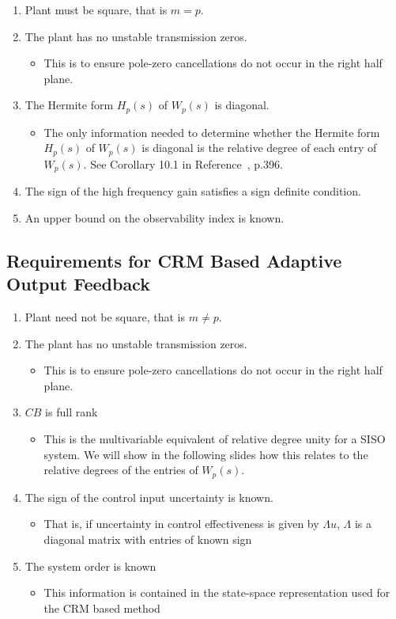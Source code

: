 \begin{enumerate}
  \item{Plant must be square, that is $m=p$.}
  \item{The plant has no unstable transmission zeros.}
  \begin{itemize}
    \item{This is to ensure pole-zero cancellations do not occur in the right half plane.}
  \end{itemize}
  \item{The Hermite form $H_{p}(s)$ of $W_{p}(s)$ is diagonal.}
  \begin{itemize}
    \item{%
      The only information needed to determine whether the Hermite form $H_{p}(s)$ of $W_{p}(s)$ is diagonal is the relative degree of each entry of $W_{p}(s)$.
      See Corollary 10.1 in Reference~\cite{narendra.stable.2005}, p.396.
    }
  \end{itemize}
  \item{The sign of the high frequency gain satisfies a sign definite condition.}
  \item{An upper bound on the observability index is known.}
\end{enumerate}

\subsection{Requirements for CRM Based Adaptive Output Feedback}

\begin{enumerate}
  \item{Plant need not be square, that is $m\neq p$.}
  \item{The plant has no unstable transmission zeros.}
  \begin{itemize}
    \item{This is to ensure pole-zero cancellations do not occur in the right half plane.}
  \end{itemize}
  \item{$CB$ is full rank}
  \begin{itemize}
    \item{%
      This is the multivariable equivalent of relative degree unity for a SISO system.
      We will show in the following slides how this relates to the relative degrees of the entries of $W_{p}(s)$.
    }
  \end{itemize}
  \item{The sign of the control input uncertainty is known.}
  \begin{itemize}
    \item{That is, if uncertainty in control effectiveness is given by $\Lambda u$, $\Lambda$ is a diagonal matrix with entries of known sign}
  \end{itemize}
  \item{The system order is known}
  \begin{itemize}
    \item{This information is contained in the state-space representation used for the CRM based method}
  \end{itemize}
\end{enumerate}

